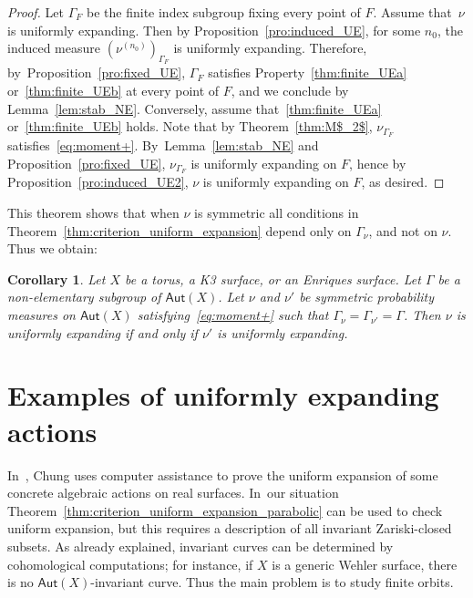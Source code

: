\documentclass[JEP,XML,SOM,Unicode,published]{cedram}
\newcommand\Aut{\mathsf{Aut}}
\theoremstyle{plain}
\newtheorem{cor}[thm]{Corollary}
\theoremstyle{definition}
\begin{document}
\begin{proof}
Let $\Gamma_F$ be the finite index subgroup fixing every point of $F$.
Assume that~$\nu$ is uniformly expanding. Then by Proposition~\ref{pro:induced_UE}, for some
$n_0$, the induced measure $(\nu^{(n_0)})_{\Gamma_F}$ is uniformly expanding. Therefore, by~Proposition~\ref{pro:fixed_UE}, $\Gamma_F$ satisfies Property~\eqref{thm:finite_UEa} or~\eqref{thm:finite_UEb} at every point of $F$, and
we conclude by Lemma~\ref{lem:stab_NE}.
Conversely, assume that~\eqref{thm:finite_UEa} or~\eqref{thm:finite_UEb} holds. Note that by Theorem~\ref{thm:M$_2$},
$\nu_{\Gamma_F}$ satisfies~\eqref{eq:moment+}. By~Lemma~\ref{lem:stab_NE} and Proposition~\ref{pro:fixed_UE},
$\nu_{\Gamma_F}$ is uniformly expanding on $F$,
hence by Proposition~\ref{pro:induced_UE2}, $\nu$ is uniformly expanding on $F$, as desired.
\end{proof}

This theorem shows that when $\nu$ is symmetric
all conditions in Theorem~\ref{thm:criterion_uniform_expansion} depend only on
$\Gamma_\nu$, and not on $\nu$. Thus we obtain:

\begin{cor}\label{cor:independence_nu}
Let $X$ be a torus, a K3 surface, or an Enriques surface. Let $\Gamma$ be a non-elementary subgroup of $\Aut(X)$. Let $\nu$ and $\nu'$ be symmetric probability measures
on $\Aut(X)$ satisfying~\eqref{eq:moment+} such that $\Gamma_\nu = \Gamma_{\nu'}=\Gamma$. Then $\nu$ is uniformly expanding if and only if $\nu'$ is
uniformly expanding.
\end{cor}

\section{Examples of uniformly expanding actions}

\label{subs:finitary}

In~\cite[\S\S 7-8]{chung}, Chung uses computer assistance to prove the uniform expansion of
some concrete algebraic actions on real surfaces. In~our situation
Theorem~\ref{thm:criterion_uniform_expansion_parabolic} can be used to
check uniform expansion, but this requires a description of all invariant Zariski-closed subsets.
As already explained, invariant curves can be determined by cohomological computations; for instance, if $X$ is a generic Wehler surface, there is no $\Aut(X)$-invariant curve. Thus the main problem is to study finite orbits.
\end{document}
